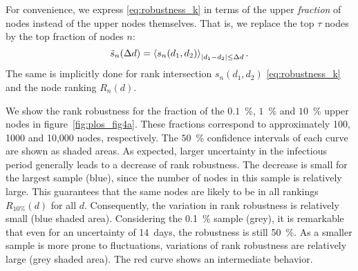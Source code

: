 For convenience, we express \eqref{eq:robustness_k} in terms of the upper \emph{fraction} of nodes instead of the upper nodes themselves.
That is, we replace the top $\tau $ nodes by the top fraction of nodes $n$:
\begin{equation}\label{eq:rank_robustness}
\tilde{s}_n (\Delta d)=\left< s_n (d_1,d_2) \right>_{\left| d_1-d_2 \right|\leq \Delta d} .
\end{equation}
The same is implicitly done for rank intersection $s_n(d_1,d_2)$ \eqref{eq:robustness_k} and the node ranking $R_n(d)$.

We show the rank robustness for the fraction of the $0.1$~\%, $1$~\% and $10$~\% upper nodes in figure~\ref{fig:plos_fig4a}.
These fractions correspond to approximately 100, 1000 and 10,000 nodes, respectively.
The $50$~\% confidence intervals of each curve are shown as shaded areas.
As expected, larger uncertainty in the infectious period generally leads to a decrease of rank robustness.
The decrease is small for the largest sample (blue), since the number of nodes in this sample is relatively large.
This guarantees that the same nodes are likely to be in all rankings $R_{10\%}(d)$ for all $d$.  
Consequently, the variation in rank robustness is relatively small (blue shaded area).
Considering the 0.1~\% sample (grey), it is remarkable that even for an uncertainty of 14~days, the robustness is still 50~\%.
As a smaller sample is more prone to fluctuations, variations of rank robustness are relatively large (grey shaded area).
The red curve shows an intermediate behavior.

